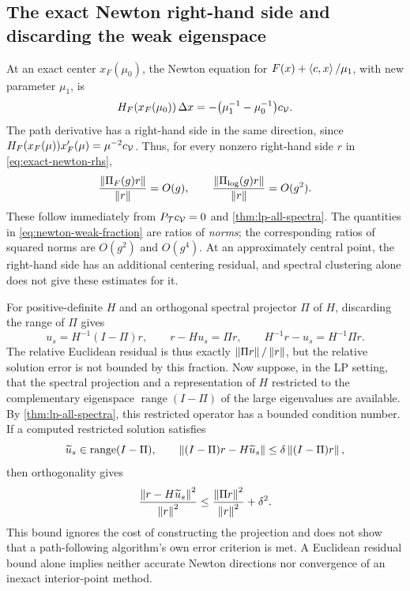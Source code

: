 \subsection{The exact Newton right-hand side and discarding the weak eigenspace}

At an exact center $x_F(\mu_0)$, the Newton equation for
$F(x)+\left\langle c,x\right\rangle/\mu_1$, with new parameter $\mu_1$, is
\begin{equation}
 H_F(x_F(\mu_0))\,\Delta x
 =-\bigl(\mu_1^{-1}-\mu_0^{-1}\bigr)c_{\mathcal V}.
 \label{eq:exact-newton-rhs}
\end{equation}
The path derivative has a right-hand side in the same direction,
since $H_F(x_F(\mu))x_F'(\mu)=\mu^{-2}c_{\mathcal V}$. Thus, for every
nonzero right-hand side $r$ in \eqref{eq:exact-newton-rhs},
\begin{equation}
 \frac{\left\lVert \Pi_F(g)r\right\rVert}{\left\lVert r\right\rVert}=O(g),\qquad
 \frac{\left\lVert \Pi_{\log}(g)r\right\rVert}{\left\lVert r\right\rVert}=O(g^2).
 \label{eq:newton-weak-fraction}
\end{equation}
These follow immediately from $P_{\mathcal T}c_{\mathcal V}=0$ and
\cref{thm:lp-all-spectra}. The quantities in
\eqref{eq:newton-weak-fraction} are ratios of \emph{norms}; the
corresponding ratios of squared norms are $O(g^2)$ and $O(g^4)$.
At an approximately central point, the right-hand side has an
additional centering residual, and spectral clustering alone does not
give these estimates for it.

For positive-definite $H$ and an orthogonal spectral projector
$\Pi$ of $H$, discarding the range of $\Pi$ gives
\begin{equation}
 u_s=H^{-1}(I-\Pi)r,\qquad
 r-Hu_s=\Pi r,\qquad
 H^{-1}r-u_s=H^{-1}\Pi r.
 \label{eq:discarding-identity}
\end{equation}
The relative Euclidean residual is thus exactly
$\left\lVert \Pi r\right\rVert/\left\lVert r\right\rVert$, but the relative solution error is not bounded
by this fraction. Now suppose, in the LP setting, that the spectral
projection and a representation of $H$ restricted to the complementary
eigenspace $\operatorname{range}(I-\Pi)$ of the large eigenvalues are
available. By
\cref{thm:lp-all-spectra}, this restricted operator has a bounded
condition number. If a computed restricted solution satisfies
\[
 \widetilde u_s\in\operatorname{range}(I-\Pi),\qquad
 \left\lVert (I-\Pi)r-H\widetilde u_s\right\rVert
 \leq\delta\left\lVert (I-\Pi)r\right\rVert,
\]
then orthogonality gives
\begin{equation}
 \frac{\left\lVert r-H\widetilde u_s\right\rVert^2}{\left\lVert r\right\rVert^2}
 \leq\frac{\left\lVert \Pi r\right\rVert^2}{\left\lVert r\right\rVert^2}+\delta^2.
 \label{eq:conditional-window-residual}
\end{equation}
This bound ignores the cost of constructing the projection and does
not show that a path-following algorithm's own error criterion is
met. A Euclidean residual bound alone implies neither accurate Newton
directions nor convergence of an inexact interior-point method.

